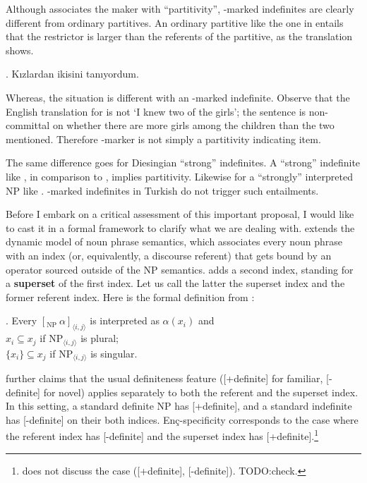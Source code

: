 \documentclass[11pt,a4paper]{article}
\newcommand{\encspec}{Enç-specific}
\begin{document}
Although  associates the maker with ``partitivity'',
\acc-marked indefinites are clearly different from ordinary
partitives. An ordinary partitive like the one in 
entails that the restrictor is larger than the referents of the
partitive, as the translation shows.

\ex.\label{exordpart} Kızlardan ikisini tanıyordum.


Whereas, the situation is different with an \acc-marked indefinite.
Observe that the English translation for  is not `I knew
two of the girls'; the sentence is non-committal on whether there are
more girls among the children than the two mentioned.  Therefore
\acc-marker is not simply a partitivity indicating item.

The same difference goes for Diesingian ``strong'' indefinites. A
``strong'' indefinite like , in comparison to
, implies partitivity. Likewise for a ``strongly''
interpreted NP like . \acc-marked indefinites in
Turkish do not trigger such entailments.



Before I embark on a critical assessment of this important proposal, I
would like to cast it in a formal framework to clarify what we are
dealing with.  extends the dynamic model of noun phrase
semantics, which associates every noun phrase with an index (or,
equivalently, a discourse referent) that gets bound by an operator
sourced outside of the NP semantics.   adds a second
index, standing for a \textbf{superset} of the first index. Let us
call the latter the superset index and the former referent index.
Here is the formal definition from :

\ex.\label{encform} Every $[_{\text{NP}}\  \alpha ]_{\langle i,j\rangle}$ is interpreted as
$\alpha(x_i)$ and\\
$x_i \subseteq x_j$ if $\text{NP}_{\langle i,j\rangle}$ is plural;\\
$\{x_i\} \subseteq x_j$ if $\text{NP}_{\langle i,j\rangle}$ is
singular.

 further claims that the usual definiteness feature ([+definite]
for familiar, [-definite] for novel) applies separately to both the referent
and the superset index. In this setting, a standard definite NP has
[+definite], and a standard indefinite has [-definite] on their both indices.
\encspec ity corresponds to the case where the referent index has [-definite]
and the superset index has [+definite].\footnote{ does not discuss
the case ([+definite], [-definite]). TODO:check.}
\end{document}
